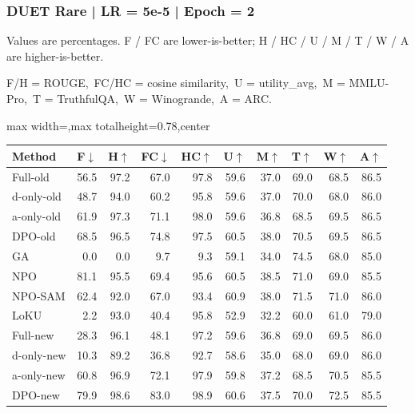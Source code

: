 \documentclass[aspectratio=169,11pt]{beamer}
\begin{document}
\begin{frame}[t]
\frametitle{DUET Rare | LR = 5e-5 | Epoch = 2}
{\tiny Values are percentages. F / FC are lower-is-better; H / HC / U / M / T / W / A are higher-is-better.}

{\tiny F/H = ROUGE,\ FC/HC = cosine similarity,\ U = utility\_avg,\ M = MMLU-Pro,\ T = TruthfulQA,\ W = Winogrande,\ A = ARC.}

\vspace{0.35em}
\centering
\scriptsize
\setlength{\tabcolsep}{3.6pt}
\renewcommand{\arraystretch}{1.05}
\begin{adjustbox}{max width=\textwidth,max totalheight=0.78\textheight,center}
\begin{tabular}{l*{9}{r}}
\toprule
Method & F$\downarrow$ & H$\uparrow$ & FC$\downarrow$ & HC$\uparrow$ & U$\uparrow$ & M$\uparrow$ & T$\uparrow$ & W$\uparrow$ & A$\uparrow$ \\
\midrule
\rowcolor{blue!10}
Full-old & 56.5 & 97.2 & 67.0 & 97.8 & 59.6 & 37.0 & 69.0 & 68.5 & 86.5 \\
\rowcolor{orange!10}
d-only-old & 48.7 & 94.0 & 60.2 & 95.8 & 59.6 & 37.0 & 70.0 & 68.0 & 86.0 \\
\rowcolor{green!10}
a-only-old & 61.9 & 97.3 & 71.1 & 98.0 & 59.6 & 36.8 & 68.5 & 69.5 & 86.5 \\
\rowcolor{gray!8}
DPO-old & 68.5 & 96.5 & 74.8 & 97.5 & 60.5 & 38.0 & 70.5 & 69.5 & 86.5 \\
\rowcolor{gray!8}
GA & 0.0 & 0.0 & 9.7 & 9.3 & 59.1 & 34.0 & 74.5 & 68.0 & 85.0 \\
\rowcolor{gray!8}
NPO & 81.1 & 95.5 & 69.4 & 95.6 & 60.5 & 38.5 & 71.0 & 69.0 & 85.5 \\
\rowcolor{gray!8}
NPO-SAM & 62.4 & 92.0 & 67.0 & 93.4 & 60.9 & 38.0 & 71.5 & 71.0 & 86.0 \\
\rowcolor{gray!8}
LoKU & 2.2 & 93.0 & 40.4 & 95.8 & 52.9 & 32.2 & 60.0 & 61.0 & 79.0 \\
\rowcolor{blue!20}
Full-new & 28.3 & 96.1 & 48.1 & 97.2 & 59.6 & 36.8 & 69.0 & 69.5 & 86.0 \\
\rowcolor{orange!20}
d-only-new & 10.3 & 89.2 & 36.8 & 92.7 & 58.6 & 35.0 & 68.0 & 69.0 & 86.0 \\
\rowcolor{green!20}
a-only-new & 60.8 & 96.9 & 72.1 & 97.9 & 59.8 & 37.2 & 68.5 & 70.5 & 85.5 \\
\rowcolor{gray!15}
DPO-new & 79.9 & 98.6 & 83.0 & 98.9 & 60.6 & 37.5 & 70.0 & 72.5 & 85.5 \\
\bottomrule
\end{tabular}
\end{adjustbox}
\end{frame}
\end{document}
